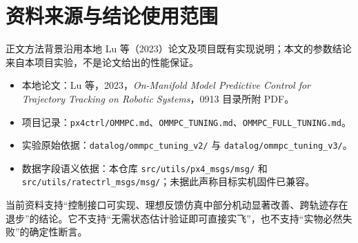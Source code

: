 \documentclass[UTF8,a4paper,11pt,fontset=fandol]{ctexart}
\newcommand{\code}[1]{{\small\nolinkurl{#1}}}
\begin{document}
\section{资料来源与结论使用范围}
正文方法背景沿用本地 Lu 等（2023）论文及项目既有实现说明；本文的参数结论来自本项目实验，不是论文给出的性能保证。
\begin{itemize}
\item 本地论文：Lu 等，2023，\emph{On-Manifold Model Predictive Control for Trajectory Tracking on Robotic Systems}，0913 目录所附 PDF。
\item 项目记录：\code{px4ctrl/OMMPC.md}、\code{OMMPC_TUNING.md}、\code{OMMPC_FULL_TUNING.md}。
\item 实验原始依据：\code{datalog/ommpc_tuning_v2/} 与 \code{datalog/ommpc_tuning_v3/}。
\item 数据字段语义依据：本仓库 \code{src/utils/px4_msgs/msg/} 和 \code{src/utils/ratectrl_msgs/msg/}；未据此声称目标实机固件已兼容。
\end{itemize}
当前资料支持“控制接口可实现、理想反馈仿真中部分机动显著改善、跨轨迹存在退步”的结论。它不支持“无需状态估计验证即可直接实飞”，也不支持“实物必然失败”的确定性断言。
\end{document}

